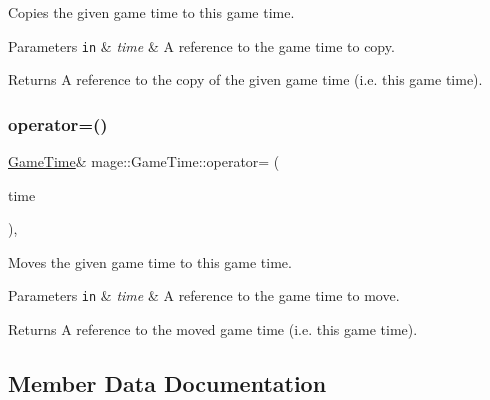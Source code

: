 Copies the given game time to this game time.


\begin{DoxyParams}[1]{Parameters}
\mbox{\tt in}  & {\em time} & A reference to the game time to copy. \\
\hline
\end{DoxyParams}
\begin{DoxyReturn}{Returns}
A reference to the copy of the given game time (i.\+e. this game time). 
\end{DoxyReturn}
\mbox{\label{classmage_1_1_game_time_a6e22ba110f678044b00eb29f6f86451c}} 
\subsubsection{\texorpdfstring{operator=()}{operator=()}\hspace{0.1cm}{\footnotesize\ttfamily [2/2]}}
{\footnotesize\ttfamily \mbox{\hyperlink{classmage_1_1_game_time}{Game\+Time}}\& mage\+::\+Game\+Time\+::operator= (\begin{DoxyParamCaption}\item[{\mbox{\hyperlink{classmage_1_1_game_time}{Game\+Time}} \&\&}]{time }\end{DoxyParamCaption})\hspace{0.3cm}{\ttfamily [default]}, {\ttfamily [noexcept]}}

Moves the given game time to this game time.


\begin{DoxyParams}[1]{Parameters}
\mbox{\tt in}  & {\em time} & A reference to the game time to move. \\
\hline
\end{DoxyParams}
\begin{DoxyReturn}{Returns}
A reference to the moved game time (i.\+e. this game time). 
\end{DoxyReturn}


\subsection{Member Data Documentation}
\mbox{\label{classmage_1_1_game_time_a2c48f0162e4ac75edb0124a22432a1f2}} 
